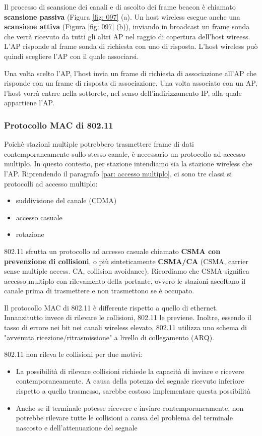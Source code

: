 \documentclass[11pt,a4paper]{article}
\begin{document}
{Il processo di scansione dei canali e di ascolto dei frame beacon è chiamato \textbf{scansione passiva} (Figura \ref{fig: 097} (a). Un host wireless esegue anche una \textbf{scansione attiva} (Figura \ref{fig: 097} (b)), inviando in broadcast un frame sonda che verrà ricevuto da tutti gli altri AP nel raggio di copertura dell'host wireess. L'AP risponde al frame sonda di richiesta con uno di risposta. L'host wireless può quindi scegliere l'AP con il quale associarsi. 

Una volta scelto l'AP, l'host invia un frame di richiesta di associazione all'AP che risponde con un frame di risposta di associazione. Una volta associato con un AP, l'host vorrà entrre nella sottorete, nel senso dell'indirizzamento IP, alla quale appartiene l'AP.

\subsubsection{Protocollo MAC di 802.11}
Poichè stazioni multiple potrebbero trasmettere frame di dati contemporaneamente sullo stesso canale, è necessario un protocollo ad accesso multiplo. In questo contesto, per stazione intendiamo sia la stazione wireless che l'AP. Riprendendo il paragrafo \ref{par: accesso multiplo}, ci sono tre classi si protocolli ad accesso multiplo:
\begin{itemize}
	\item suddivisione del canale (CDMA)
	\item accesso casuale
	\item rotazione
\end{itemize}
802.11 sfrutta un protocollo ad accesso casuale chiamato \textbf{CSMA con prevenzione di collisioni}, o più sinteticamente \textbf{CSMA/CA} (CSMA, carrier sense multiple access. CA, collision avoidance). Ricordiamo che CSMA significa accesso multiplo con rilevamento della portante, ovvero le stazioni ascoltano il canale prima di trasmettere e non trasmettono se è occupato.

Il protocollo MAC di 802.11 è differente rispetto a quello di ethernet. Innanzitutto invece di rilevare le collisioni, 802.11 le previene. Inoltre, essendo il tasso di errore nei bit nei canali wireless elevato, 802.11 utilizza uno schema di "avvenuta ricezione/ritrasmissione"  a livello di collegamento (ARQ).

802.11 non rileva le collisioni per due motivi:
\begin{itemize}
	\item La possibilità di rilevare collisioni richiede la capacità di inviare e ricevere contemporaneamente. A causa della potenza del segnale ricevuto inferiore rispetto a quello trasmesso, sarebbe costoso implementare questa possibilità
	\item Anche se il terminale potesse ricevere e inviare contemporaneamente, non potrebbe rilevare tutte le collisioni a causa del problema del terminale nascosto e dell'attenuazione del segnale
\end{itemize}

}
\end{document}
